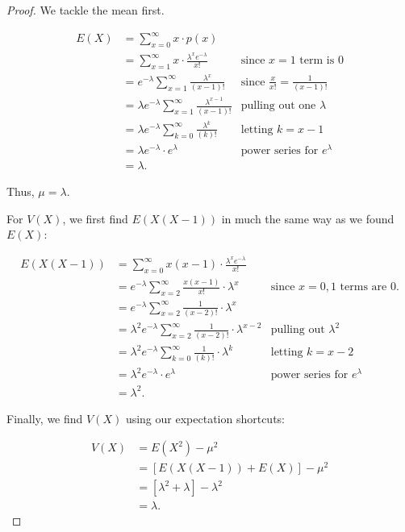 \documentclass[
]{book}
\theoremstyle{definition}
\theoremstyle{definition}
\theoremstyle{definition}
\theoremstyle{definition}
\theoremstyle{remark}
\begin{document}
\begin{proof}
We tackle the mean first.

\begin{align*} 
E(X) &= \sum_{x=0}^\infty x \cdot p(x) \\
     &= \sum_{x=1}^\infty x \cdot \frac{\lambda^x e^{-\lambda}}{x!} & \text{since }x=1 \text{ term is } 0\\
     &= e^{-\lambda} \sum_{x=1}^\infty \frac{\lambda^x}{(x-1)!} & \text{since } \frac{x}{x!}=\frac{1}{(x-1)!}\\
     &= \lambda e^{-\lambda} \sum_{x=1}^\infty \frac{\lambda^{x-1}}{(x-1)!} & \text{pulling out one }\lambda \\
     &= \lambda e^{-\lambda} \sum_{k=0}^\infty \frac{\lambda^{k}}{(k)!} & \text{letting }  k = x-1\\
     &= \lambda e^{-\lambda}\cdot e^{\lambda} &\text{power series for }e^\lambda\\
     &= \lambda.
\end{align*}

Thus, \(\mu = \lambda\).

For \(V(X)\), we first find \(E(X(X-1))\) in much the same way as we found \(E(X)\):

\begin{align*}
E(X(X-1)) &= \sum_{x=0}^\infty x(x-1)\cdot \frac{\lambda^x e^{-\lambda}}{x!} \\
    &= e^{-\lambda} \sum_{x=2}^\infty \frac{x(x-1)}{x!} \cdot \lambda^x & \text{since }x=0,1 \text{ terms are }0. \\
    &= e^{-\lambda} \sum_{x=2}^\infty \frac{1}{(x-2)!} \cdot \lambda^x\\
    &= \lambda^2 e^{-\lambda} \sum_{x=2}^\infty \frac{1}{(x-2)!} \cdot \lambda^{x-2}  & \text{pulling out }\lambda^2 \\
    &= \lambda^2 e^{-\lambda} \sum_{k=0}^\infty \frac{1}{(k)!} \cdot \lambda^{k} &\text{letting }k=x-2\\
    &= \lambda^2 e^{-\lambda} \cdot e^{\lambda}  & \text{power series for }e^\lambda\\
    &= \lambda^2.
\end{align*}

Finally, we find \(V(X)\) using our expectation shortcuts:

\begin{align*}
V(X) &= E(X^2) - \mu^2 \\
  &= [E(X(X-1))+E(X)] - \mu^2 \\
  &= [\lambda^2 + \lambda] - \lambda^2 \\
  &= \lambda.
\end{align*}
\end{proof}
\end{document}
